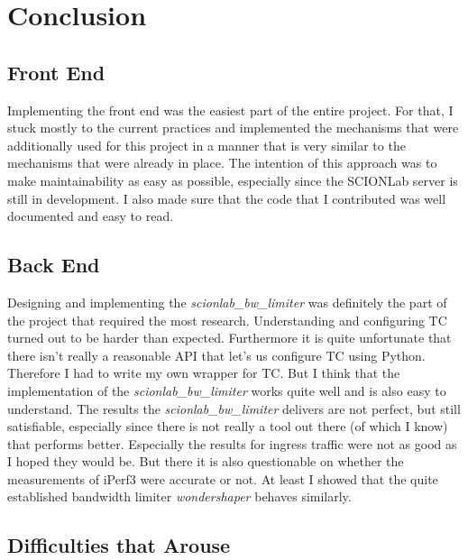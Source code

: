 \chapter{Conclusion}
\section{Front End}

Implementing the front end was the easiest part of the entire project. For that, I stuck mostly to the current practices and implemented the mechanisms that were additionally used for this project in a manner that is very similar to the mechanisms that were already in place. The intention of this approach was to make maintainability as easy as possible, especially since the \acs{SCIONLab} server is still in development. I also made sure that the code that I contributed was well documented and easy to read.

\section{Back End}

Designing and implementing the \textit{scionlab\_bw\_limiter} was definitely the part of the project that required the most research. Understanding and configuring \acs{TC} turned out to be harder than expected. Furthermore it is quite unfortunate that there isn't really a reasonable \acs{API} that let's us configure \acs{TC} using Python. Therefore I had to write my own wrapper for \acs{TC}. But I think that the implementation of the \textit{scionlab\_bw\_limiter} works quite well and is also easy to understand. The results the \textit{scionlab\_bw\_limiter} delivers are not perfect, but still satisfiable, especially since there is not really a tool out there (of which I know) that performs better. Especially the results for ingress traffic were not as good as I hoped they would be. But there it is also questionable on whether the measurements of iPerf3 were accurate or not. At least I showed that the quite established bandwidth limiter \textit{wondershaper} behaves similarly.

\section{Difficulties that Arouse}

